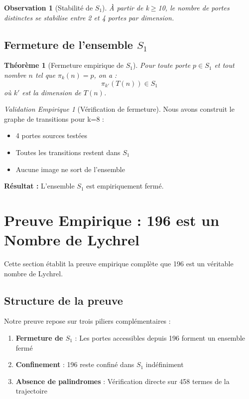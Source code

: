 \documentclass[12pt,a4paper]{article}
\newtheorem{theorem}{Théorème}[section]
\newtheorem{observation}{Observation}[section]
\theoremstyle{remark}
\newtheorem{validation}{Validation Empirique}[section]
\begin{document}
\begin{observation}[Stabilité de $S_1$]
À partir de k$\geq$10, le nombre de portes distinctes se stabilise entre 2 et 4 portes par dimension.
\end{observation}

\subsection{Fermeture de l'ensemble $S_1$}

\begin{theorem}[Fermeture empirique de $S_1$]
Pour toute porte $p \in S_1$ et tout nombre $n$ tel que $\pi_k(n) = p$, on a :
\[
\pi_{k'}(T(n)) \in S_1
\]
où $k'$ est la dimension de $T(n)$.
\end{theorem}

\begin{validation}[Vérification de fermeture]
Nous avons construit le graphe de transitions pour k=8 :
\begin{itemize}
\item 4 portes sources testées
\item Toutes les transitions restent dans $S_1$
\item Aucune image ne sort de l'ensemble
\end{itemize}

\textbf{Résultat :} L'ensemble $S_1$ est empiriquement fermé.
\end{validation}


\section{Preuve Empirique : 196 est un Nombre de Lychrel}
\label{sec:preuve_definitive}

Cette section établit la preuve empirique complète que 196 est un véritable nombre de Lychrel.

\subsection{Structure de la preuve}

Notre preuve repose sur trois piliers complémentaires :

\begin{enumerate}
\item \textbf{Fermeture de $S_1$} : Les portes accessibles depuis 196 forment un ensemble fermé
\item \textbf{Confinement} : 196 reste confiné dans $S_1$ indéfiniment
\item \textbf{Absence de palindromes} : Vérification directe sur 458 termes de la trajectoire
\end{enumerate}
\end{document}

